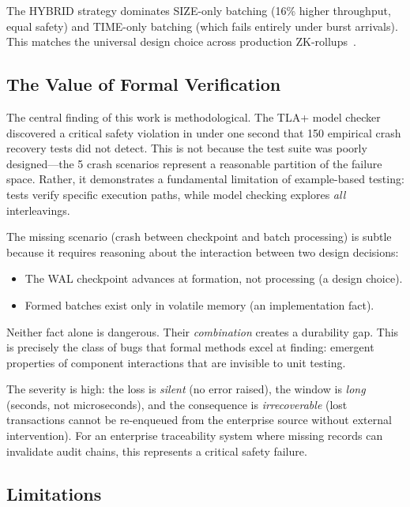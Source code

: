 The HYBRID strategy dominates SIZE-only batching (16\% higher throughput,
equal safety) and TIME-only batching (which fails entirely under burst
arrivals). This matches the universal design choice across production
ZK-rollups~\cite{chaliasos2024analyzing}.

\subsection{The Value of Formal Verification}

The central finding of this work is methodological. The TLA+ model checker
discovered a critical safety violation in under one second that 150 empirical
crash recovery tests did not detect. This is not because the test suite was
poorly designed---the 5 crash scenarios represent a reasonable partition of
the failure space. Rather, it demonstrates a fundamental limitation of
example-based testing: tests verify specific execution paths, while model
checking explores \emph{all} interleavings.

The missing scenario (crash between checkpoint and batch processing) is
subtle because it requires reasoning about the interaction between two
design decisions:
\begin{itemize}
\item The WAL checkpoint advances at formation, not processing (a design choice).
\item Formed batches exist only in volatile memory (an implementation fact).
\end{itemize}

Neither fact alone is dangerous. Their \emph{combination} creates a
durability gap. This is precisely the class of bugs that formal methods
excel at finding: emergent properties of component interactions that are
invisible to unit testing.

The severity is high: the loss is \emph{silent} (no error raised), the
window is \emph{long} (seconds, not microseconds), and the consequence
is \emph{irrecoverable} (lost transactions cannot be re-enqueued from the
enterprise source without external intervention). For an enterprise
traceability system where missing records can invalidate audit chains,
this represents a critical safety failure.

\subsection{Limitations}

